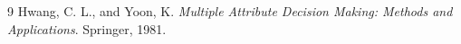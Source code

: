 \begin{thebibliography}{9}
  Hwang, C. L., and Yoon, K. \textit{Multiple Attribute Decision Making: Methods and Applications}. Springer, 1981.
\end{thebibliography}
